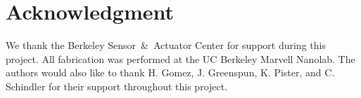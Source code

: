 \section*{Acknowledgment}

We thank the Berkeley Sensor~\&~Actuator Center for support during this project. All fabrication was performed at the UC Berkeley Marvell Nanolab. The authors would also like to thank H. Gomez, J. Greenspun, K. Pister, and C. Schindler for their support throughout this project.